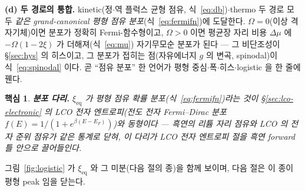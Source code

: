 \documentclass[11pt,a4paper]{article}
\newtheorem*{keybox}{핵심}
\newcommand{\eq}{\mathrm{eq}}
\begin{document}
\textbf{(d) 두 경로의 통합.} kinetic(정$\cdot$역 플럭스 균형 점유, 식~\eqref{eq:db})$\cdot$thermo 두 경로
모두 \emph{같은 grand-canonical 평형 점유 분포}(식~\eqref{eq:fermifn})에 도달한다. $\Omega=0$(이상 격자기체)이면 분포가 정확히 Fermi-함수형이고, $\Omega>0$
이면 평균장 자리 비용 $\Delta\mu$ 에 $-\Omega(1-2\xi)$ 가 더해져(식~\eqref{eq:mu}) 자기무모순 분포가 된다 — 그
비단조성이 \S\ref{sec:hys} 의 히스이고, 그 분포가 접히는 점(자유에너지 $g$ 의 변곡, spinodal)이 식~\eqref{eq:spinodal} 이다. 곧 ``점유 분포''
한 언어가 평형 중심$\cdot$폭$\cdot$히스$\cdot$logistic 을 한 줄에 꿴다.

\begin{keybox}
\textbf{분포 다리.} $\xi_\eq$ 가 평형 점유 확률 분포(식~\eqref{eq:fermifn})라는 것이 \S\ref{sec:lco-electronic}
의 LCO \emph{전자} 엔트로피(전도 전자 Fermi--Dirac 분포 $f(E)=1/(1+e^{\beta(E-E_F)})$)와 \emph{동형}이다 —
흑연의 \emph{리튬 자리} 점유와 LCO 의 \emph{전자 준위} 점유가 같은 통계로 닫혀, 이 다리가 LCO 전자 엔트로피
절을 흑연 forward 틀 안으로 끌어들인다.
\end{keybox}

그림~\ref{fig:logistic} 가 $\xi_\eq$ 와 그 미분(다음 절의 종)을 함께 보이며, 다음 절은 이 종이 평형 peak 임을 닫는다.
\end{document}
